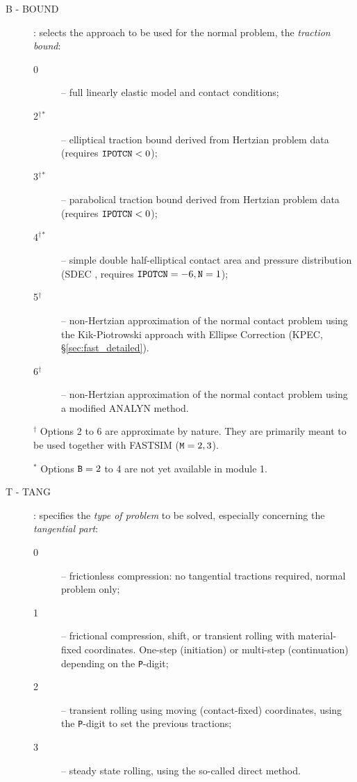 \documentclass[12pt]{report}
\renewcommand{\magenta}[1]{}
\begin{document}
\begin{description}
\item[B - BOUND]  \label{b-digit}  : selects the approach to be
        used for the normal problem, the {\em traction bound\/}:
\begin{description}
\item[0] -- full linearly elastic model and contact conditions;
\magenta{
\item[1] -- full linearly elastic model, extended with a thin, compressible
        elastic layer, with full contact conditions (\S \ref{sec:thin_sheet});
}
\item[2$^\dagger$$^*$] -- elliptical traction bound derived from Hertzian
        problem data (requires ${\tt IPOTCN}<0$);
\item[3$^\dagger$$^*$] -- parabolical traction bound derived from Hertzian
        problem data (requires ${\tt IPOTCN}<0$);
\item[4$^\dagger$$^*$] -- simple double half-elliptical contact area and
        pressure distribution (SDEC \cite{Piotrowski2017}, requires
        ${\tt IPOTCN}=-6, {\tt N}=1$);
\item[5$^\dagger$] -- non-Hertzian approximation of the normal contact problem
        using the Kik-Piotrowski approach with Ellipse Correction (KPEC,
        \S \ref{sec:fast_detailed}).
\item[6$^\dagger$] -- non-Hertzian approximation of the normal contact problem
        using a modified ANALYN method.
\end{description}
$^\dagger$ Options 2 to 6 are approximate by nature. They are primarily meant
to be used together with FASTSIM (${\tt M}=2, 3$).

$^*$ Options ${\tt B}=2$ to 4 are not yet available in module 1.

\item[T - TANG]  \label{t-digit}  : specifies the {\em type of problem\/}
        to be solved, especially concerning the {\em tangential part\/}:
\begin{description}
\item[0] -- frictionless compression: no tangential tractions
        required, normal problem only;
\item[1] -- frictional compression, shift, or transient rolling with
        material-fixed coordinates. One-step (initiation) or multi-step
        (continuation) depending on the {\tt P}-digit;
\item[2] -- transient rolling using moving (contact-fixed) coordinates,
        using the {\tt P}-digit to set the previous tractions;
\item[3] -- steady state rolling, using the so-called direct method.
\end{description}


\end{description}
\end{document}
